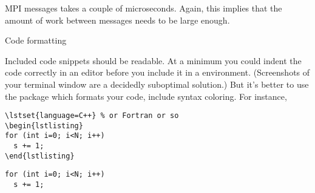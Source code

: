 MPI messages takes a couple of microseconds. Again, this implies that the
amount of work between messages needs to be large enough.

 {Code formatting}

Included code snippets should be readable. At a minimum you could 
indent the code correctly in an editor before you include it in
a  environment. (Screenshots of your terminal
window are a decidedly suboptimal solution.)
But it's better to use the  package which formats
your code, include syntax coloring. For instance, 
\begin{verbatim}
\lstset{language=C++} % or Fortran or so
\begin{lstlisting}
for (int i=0; i<N; i++)
  s += 1;
\end{lstlisting}
\end{verbatim}
\lstset{language=C++} %
\begin{lstlisting}
for (int i=0; i<N; i++)
  s += 1;
\end{lstlisting}

\endinput

\Level 1 {Including code in your writeup}

If you include code samples in your writeup, make sure they look good. For starters,
use a mono-spaced font. In \LaTeX, you can use the \n{verbatim} environment or the 
\n{verbatiminput} command. In that section option the source is included automatically,
rather than cut and pasted. This is to be preferred, since your writeup will
stay current after you edit the source file.

Including whole source files makes for a long and boring writeup. The code samples in this
book were generated as follows. In the source files, the relevant snippet was marked as
\begin{verbatim}
... boring stuff
//snippet samplex
  .. interesting! ..
//snippet end
... more boring stuff
\end{verbatim}
The files were then processed with the following command line (actually, included
in a makefile, which requires doubling the dollar signs):
\begin{verbatim}
for f in *.{c,cxx,h} ; do
  cat $x | awk 'BEGIN {f=0}
                /snippet end/ {f=0}
                f==1 {print $0 > file}
                /snippet/ && !/end/ {f=1; file=$2 }
               '
done
\end{verbatim}
which gives (in this example) a file \n{samplex}. Other solutions are of course possible.

